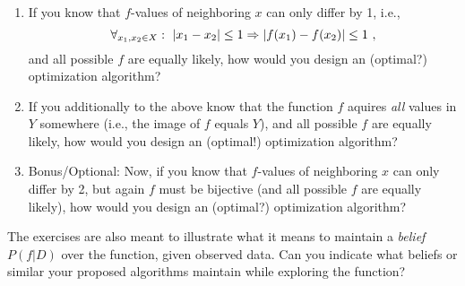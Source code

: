 \begin{enumerate}
\item If you know that $f$-values of neighboring $x$ can only differ by 1, i.e.,
$$\forall_{x_1,x_2\in X}:~ |x_1-x_2|\le 1 \Rightarrow |f(x_1)-f(x_2)|\le 1 ~,$$
and all possible $f$ are equally likely, how would you design an (optimal?) optimization algorithm?

\item If you additionally to the above know that the function $f$ aquires \emph{all} values in $Y$ somewhere (i.e., the image of $f$ equals $Y$),
and all possible $f$ are equally likely, how would you design an (optimal!) optimization algorithm?

\item Bonus/Optional: Now, if you know that $f$-values of neighboring $x$ can only differ by 2, but again $f$ must be bijective (and all possible $f$ are equally likely), how would you design an (optimal?) optimization algorithm?
\end{enumerate}

The exercises are also meant to illustrate what it means to maintain a \emph{belief} $P(f|D)$ over the function, given observed data. Can you indicate what beliefs or similar your proposed algorithms maintain while exploring the function?




\exerfoot

